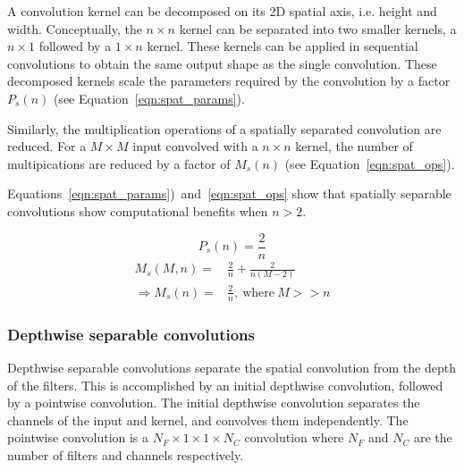 \documentclass{article}
\begin{document}
	
	A convolution kernel can be decomposed on its 2D spatial axis, i.e. height and width. Conceptually, the $n \times n$ kernel can be separated into two smaller kernels, a $n \times 1$ followed by a $1 \times n$ kernel. These kernels can be applied in sequential convolutions to obtain the same output shape as the single convolution. These decomposed kernels scale the parameters required by the convolution by a factor $P_s(n)$ (see Equation~\ref{eqn:spat_params}). 
	
	Similarly, the multiplication operations of a spatially separated convolution are reduced. For a $M \times M$ input convolved with a $n \times n$ kernel, the number of multipications are reduced by a factor of $M_s(n)$ (see Equation~\ref{eqn:spat_ops}). 
	
	Equations~\ref{eqn:spat_params})~and~\ref{eqn:spat_ops} show that spatially separable convolutions show computational benefits when $n > 2$. 
	
	\begin{multicols}{2}
		\begin{equation}\label{eqn:spat_params}
			P_s(n) = \frac{2}{n}
		\end{equation}
	\break
		\begin{equation}\label{eqn:spat_ops}
			\begin{split}
				M_s(M, n) = & \frac{2}{n} + \frac{2}{n(M-2)} \\
				\Rightarrow M_s(n) = & \frac{2}{n},~\text{where}~M >> n
			\end{split}
		\end{equation}		
	\end{multicols}
	
	\subsubsection{Depthwise separable convolutions}	
	
	Depthwise separable convolutions separate the spatial convolution from the depth of the filters. This is accomplished by an initial depthwise convolution, followed by a pointwise convolution. The initial depthwise convolution separates the channels of the input and kernel, and convolves them independently. The pointwise convolution is a $N_F \times 1 \times 1 \times N_C$ convolution where $N_F$ and $N_C$ are the number of filters and channels respectively. 
	
\end{document}
